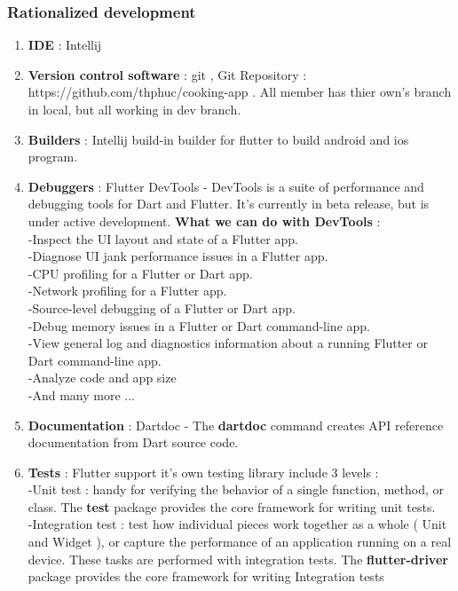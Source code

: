 \documentclass{article}
\begin{document}
\subsubsection{Rationalized development}
\begin{enumerate}

\item \textbf{IDE} : Intellij 
\item \textbf{Version control software}  : git , Git Repository : https://github.com/thphuc/cooking-app  . All member has thier own's branch in local, but all working in dev branch.
\item \textbf{Builders} : Intellij build-in builder for flutter to build android and ios program.
\item \textbf{Debuggers} : Flutter DevTools - DevTools is a suite of performance and debugging tools for Dart and Flutter. It’s currently in beta release, but is under active development.\textbf{ What we can do with DevTools } : \\
-Inspect the UI layout and state of a Flutter app. \\
-Diagnose UI jank performance issues in a Flutter app. \\
-CPU profiling for a Flutter or Dart app. \\
-Network profiling for a Flutter app. \\
-Source-level debugging of a Flutter or Dart app. \\
-Debug memory issues in a Flutter or Dart command-line app. \\
-View general log and diagnostics information about a running Flutter or Dart command-line app. \\
-Analyze code and app size \\
-And many more ... \\
\item \textbf{Documentation} : Dartdoc - The \textbf{dartdoc} command creates API reference documentation from Dart source code.
\item \textbf{Tests} : Flutter support it's own testing library include 3 levels :  \\
-Unit test :  handy for verifying the behavior of a single function, method, or class. The \textbf{test} package provides the core framework for writing unit tests. \\
-Integration test : test how individual pieces work together as a whole ( Unit and Widget ), or capture the performance of an application running on a real device. These tasks are performed with integration tests.  The \textbf{flutter-driver} package provides the core framework for writing Integration tests \\

\end{enumerate}
\end{document}
